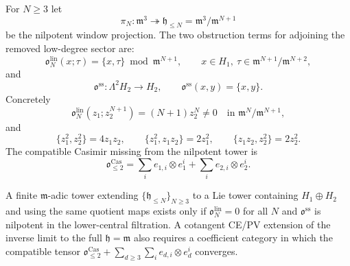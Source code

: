 \begin{defn}
\label{defn:nilpotent-low-degree-obstruction-terms}
  For \(N\geq3\) let
  \[
    \pi_N\colon\mathfrak m^3\twoheadrightarrow
    \mathfrak h_{\leq N}=\mathfrak m^3/\mathfrak m^{N+1}
  \]
  be the nilpotent window projection.  The two obstruction terms for
  adjoining the removed low-degree sector are:
  \[
    \mathfrak o^{\mathrm{lin}}_N(x;\tau)
      =\{x,\tau\}\bmod \mathfrak m^{N+1},
      \qquad
      x\in H_1,\ \tau\in \mathfrak m^{N+1}/\mathfrak m^{N+2},
  \]
  and
  \[
    \mathfrak o^{\mathrm{ss}}\colon\Lambda^2H_2\to H_2,\qquad
    \mathfrak o^{\mathrm{ss}}(x,y)=\{x,y\}.
  \]
  Concretely
  \[
    \mathfrak o^{\mathrm{lin}}_N(z_1;z_2^{N+1})
      =(N+1)z_2^N\neq0
      \quad\text{in }\mathfrak m^N/\mathfrak m^{N+1},
  \]
  and
  \[
    \{z_1^2,z_2^2\}=4z_1z_2,\qquad
    \{z_1^2,z_1z_2\}=2z_1^2,\qquad
    \{z_1z_2,z_2^2\}=2z_2^2 .
  \]
  The compatible Casimir missing from the nilpotent tower is
  \[
    \mathfrak o^{\mathrm{Cas}}_{\leq2}
      =\sum_i e_{1,i}\otimes e_1^i
       +\sum_i e_{2,i}\otimes e_2^i .
  \]
\end{defn}

\begin{lem}
\label{lem:nilpotent-obstructions-exact}
  A finite \(\mathfrak m\)-adic tower extending
  \(\{\mathfrak h_{\leq N}\}_{N\geq3}\) to a Lie tower containing
  \(H_1\oplus H_2\) and using the same quotient maps exists only if
  \(\mathfrak o^{\mathrm{lin}}_N=0\) for all \(N\) and
  \(\mathfrak o^{\mathrm{ss}}\) is nilpotent in the lower-central
  filtration.  A cotangent CE/PV extension of the inverse limit to the
  full \(\mathfrak h=\mathfrak m\) also requires a coefficient category
  in which the compatible tensor
  \(\mathfrak o^{\mathrm{Cas}}_{\leq2}
    +\sum_{d\geq3}\sum_i e_{d,i}\otimes e_d^i\)
  converges.
\end{lem}

